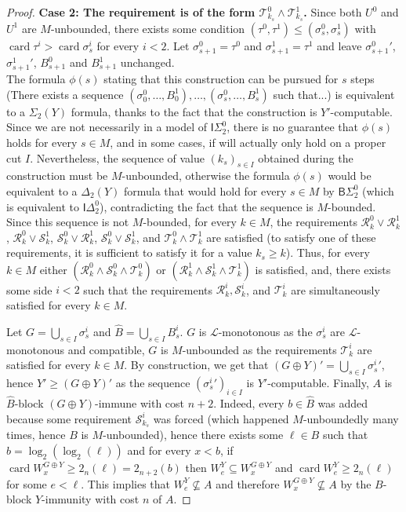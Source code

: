 \documentclass{article}
\def\L{\mathcal{L}}
\def\R{\mathcal{R}}
\def\T{\mathcal{T}}
\def\S{\mathcal{S}}
\newcommand{\ISig}{\mathsf{I}\Sigma^0}
\newcommand{\IDelta}{\mathsf{I}\Delta^0}
\newcommand{\BSig}{\mathsf{B}\Sigma^0}
\newcommand{\card}{\operatorname{card}}
\numberwithin{theorem}{section}
\begin{document}
\begin{proof}
\textbf{Case 2: The requirement is of the form $\mathcal{T}^0_{k_s} \wedge \mathcal{T}^1_{k_s}$.} Since both $U^0$ and $U^1$ are $M$-unbounded, there exists some condition $(\tau^0, \tau^1) \leq (\sigma^0_s, \sigma^1_s)$ with $\card \tau^i > \card \sigma^i_s$ for every $i < 2$. Let $\sigma^0_{s+1} = \tau^0$ and $\sigma^1_{s+1} = \tau^1$ and leave ${\sigma^{0}_{s+1}}'$, ${\sigma^{1}_{s+1}}'$, $B^0_{s+1}$ and $B^1_{s+1}$ unchanged. \\

The formula $\phi(s)$ stating that this construction can be pursued for $s$ steps (There exists a sequence $(\sigma_0^0, \dots,B_0^1),\dots, (\sigma_s^0, \dots,B_s^1)$ such that...) is equivalent to a $\Sigma_2(Y)$ formula, thanks to the fact that the construction is $Y'$-computable. Since we are not necessarily in a model of $\ISig_2$, there is no guarantee that $\phi(s)$ holds for every $s \in M$, and in some cases, if will actually only hold on a proper cut $I$. Nevertheless, the sequence of value $(k_s)_{s \in I}$ obtained during the construction must be $M$-unbounded, otherwise the formula $\phi(s)$ would be equivalent to a $\Delta_2(Y)$ formula that would hold for every $s \in M$ by $\BSig_2$ (which is equivalent to $\IDelta_2$), contradicting the fact that the sequence is $M$-bounded. Since this sequence is not $M$-bounded, for every $k \in M$, the requirements $\R^0_k \vee \R^1_k$, $\R^0_k \vee \S^1_k$, $\S^0_k \vee \R^1_k$, $\S^0_k \vee \S^1_k$, and $\T^0_k \wedge \T^1_k$ are satisfied (to satisfy one of these requirements, it is sufficient to satisfy it for a value $k_s \geq k$). Thus, for every $k \in M$ either $(\R^0_k \wedge \S^0_k \wedge \T^0_k)$ or $(\R^1_k \wedge \S^1_k \wedge \T^1_k)$ is satisfied, and, there exists some side $i < 2$ such that the requirements $\R^i_k, \S^i_k$, and $\T^i_k$ are simultaneously satisfied for every $k \in M$.

Let $G = \bigcup_{s \in I} \sigma^i_s$ and $\hat{B} = \bigcup_{s \in I} B^i_s$. $G$ is $\L$-monotonous as the $\sigma^i_s$ are $\L$-monotonous and compatible, $G$ is $M$-unbounded as the requirements $\T^i_k$ are satisfied for every $k \in M$. By construction, we get that $(G \oplus Y)' = \bigcup_{s \in I} {\sigma^{i}_s}'$, hence $Y' \geq (G \oplus Y)'$ as the sequence $({\sigma^{i}_s}')_{i \in I}$ is $Y'$-computable. Finally, $A$ is $\hat{B}$-block $(G \oplus Y)$-immune with cost $n + 2$. Indeed, every $b \in \hat{B}$ was added because some requirement $\S^i_{k_s}$ was forced (which happened $M$-unboundedly many times, hence $B$ is $M$-unbounded), hence there exists some $\ell \in B$ such that $b = \log_2(\log_2(\ell))$ and for every $x < b$, if $\card W_x^{G \oplus Y} \geq 2_n(\ell) = 2_{n+2}(b)$ then $W_e^Y \subseteq W^{G \oplus Y}_x$ and $\card W_e^Y \geq 2_n(\ell)$ for some $e < \ell$. This implies that $W^Y_e \not \subseteq A$ and therefore $W^{G \oplus Y}_x \not \subseteq A$ by the $B$-block $Y$-immunity with cost $n$ of $A$.



\end{proof}
\end{document}
